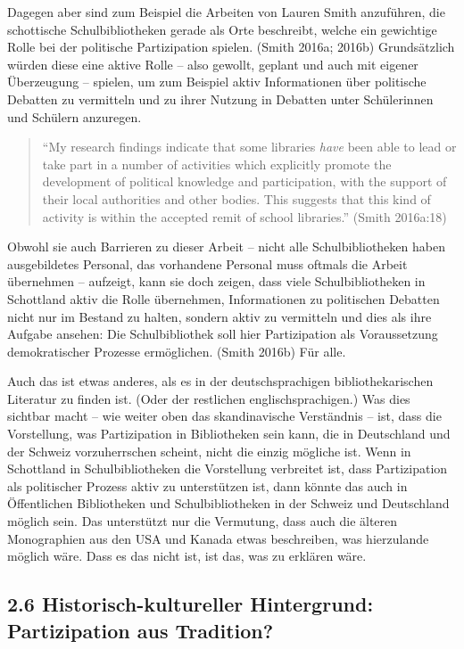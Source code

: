 \documentclass[a4paper,
fontsize=11pt,
oneside,
numbers=noperiodatend,
parskip=half-,
bibliography=totoc,
final
]{scrartcl}
\begin{document}
Dagegen aber sind zum Beispiel die Arbeiten von Lauren Smith anzuführen,
die schottische Schulbibliotheken gerade als Orte beschreibt, welche ein
gewichtige Rolle bei der politische Partizipation spielen. (Smith 2016a;
2016b) Grundsätzlich würden diese eine aktive Rolle -- also gewollt,
geplant und auch mit eigener Überzeugung -- spielen, um zum Beispiel
aktiv Informationen über politische Debatten zu vermitteln und zu ihrer
Nutzung in Debatten unter Schülerinnen und Schülern anzuregen.

\begin{quote}
\enquote{My research findings indicate that some libraries \emph{have}
been able to lead or take part in a number of activities which
explicitly promote the development of political knowledge and
participation, with the support of their local authorities and other
bodies. This suggests that this kind of activity is within the accepted
remit of school libraries.} (Smith 2016a:18)
\end{quote}

Obwohl sie auch Barrieren zu dieser Arbeit -- nicht alle
Schulbibliotheken haben ausgebildetes Personal, das vorhandene Personal
muss oftmals die Arbeit übernehmen -- aufzeigt, kann sie doch zeigen,
dass viele Schulbibliotheken in Schottland aktiv die Rolle übernehmen,
Informationen zu politischen Debatten nicht nur im Bestand zu halten,
sondern aktiv zu vermitteln und dies als ihre Aufgabe ansehen: Die
Schulbibliothek soll hier Partizipation als Voraussetzung demokratischer
Prozesse ermöglichen. (Smith 2016b) Für alle.

Auch das ist etwas anderes, als es in der deutschsprachigen
bibliothekarischen Literatur zu finden ist. (Oder der restlichen
englischsprachigen.) Was dies sichtbar macht -- wie weiter oben das
skandinavische Verständnis -- ist, dass die Vorstellung, was
Partizipation in Bibliotheken sein kann, die in Deutschland und der
Schweiz vorzuherrschen scheint, nicht die einzig mögliche ist. Wenn in
Schottland in Schulbibliotheken die Vorstellung verbreitet ist, dass
Partizipation als politischer Prozess aktiv zu unterstützen ist, dann
könnte das auch in Öffentlichen Bibliotheken und Schulbibliotheken in
der Schweiz und Deutschland möglich sein. Das unterstützt nur die
Vermutung, dass auch die älteren Monographien aus den USA und Kanada
etwas beschreiben, was hierzulande möglich wäre. Dass es das nicht ist,
ist das, was zu erklären wäre.

\subsection{2.6 Historisch-kultureller Hintergrund: Partizipation aus
Tradition?}\label{historisch-kultureller-hintergrund-partizipation-aus-tradition}
\end{document}
